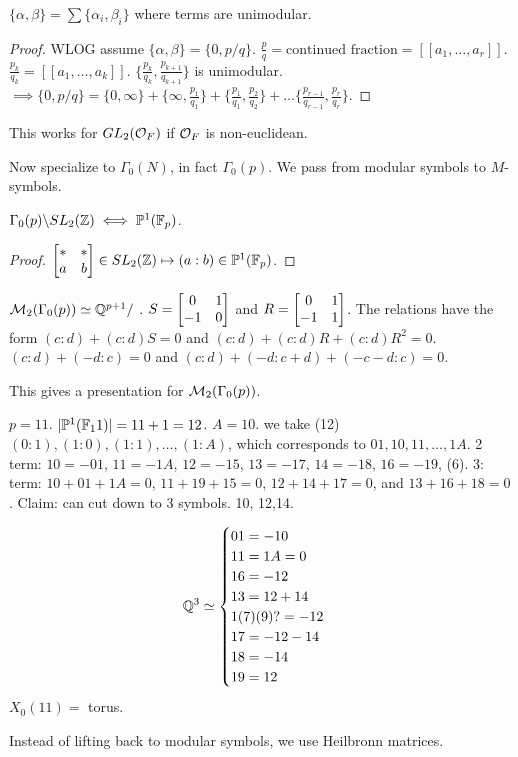 \documentclass[]{article}
\begin{document}
\begin{theorem}
	$\{\alpha,\beta\} = \sum\{\alpha_i,\beta_i\}$ where terms are unimodular.
\end{theorem}
\begin{proof}
	WLOG assume $\{\alpha,\beta\} = \{0,p/q\}$. $\frac{p}{q} = \text{continued fraction} = [[a_1,\dots,a_r]]$. $\frac{p_k}{q_k} = [[a_1,\dots,a_k]]$. $\{\frac{p_k}{q_k},\frac{p_{k+1}}{q_{k+1}}\}$ is unimodular. $\implies \{0,p/q\} = \{0,\infty\} + \{\infty,\frac{p_1}{q_1}\} + \{\frac{p_1}{q_1},\frac{p_2}{q_2}\} + \dots \{\frac{p_{r-1}}{q_{r-1}},\frac{p_r}{q_r}\}$.
\end{proof}
\begin{remark}
	This works for $GL_2(\mathcal{O}_F)$ if $\mathcal{O}_F$ is non-euclidean.
\end{remark}
Now specialize to $\Gamma_0(N)$, in fact $\Gamma_0(p)$. We pass from modular symbols to $M$-symbols.
\begin{proposition}
	$\Gamma_0(p)\backslash SL_2(\mathbb{Z}) \overset{~}{\iff} \mathbb{P}^1(\mathbb{F}_p)$.
\end{proposition}
\begin{proof}
	$\begin{bmatrix}*&*\\a&b\end{bmatrix}\in SL_2(\mathbb{Z}) \mapsto (a:b) \in \mathbb{P}^1(\mathbb{F}_p)$.
\end{proof}

$\mathcal{M}_2(\Gamma_0(p)) \simeq \mathbb{Q}^{p+1}/~$. $S = \begin{bmatrix}0&1\\-1&0\end{bmatrix}$ and $R = \begin{bmatrix}0&1\\-1&1\end{bmatrix}$. The relations have the form $(c:d)+(c:d)S = 0$ and $(c:d) + (c:d)R+(c:d)R^2 = 0$.
$(c:d) + (-d:c) = 0$ and $(c:d) + (-d:c+d)+(-c-d:c) = 0$.

\begin{theorem}
	This gives a presentation for $\mathcal{M}_2(\Gamma_0(p))$.
\end{theorem}
\begin{example}
	$p=11$. $|\mathbb{P}^1(\mathbb{F}_11)| = 11+1 = 12$. $A = 10$. we take (12) $(0:1),(1:0),(1:1),\dots,(1:A)$, which corresponds to $01,10,11,\dots,1A$. 2 term: $10=-01$, $11=-1A$, $12=-15$, $13=-17$, $14 = -18$, $16=-19$, (6). 3: term: $10+01+1A=0$, $11+19+15 = 0$, $12+14+17=0$, and $13+16+18 = 0$.
	Claim: can cut down to 3 symbols. 10, 12,14. 
	
	$$\mathbb{Q}^3 \simeq \begin{cases}01=-10 \\ 11 = 1A = 0 \\ 16 = -12 \\ 13 = 12+14 \\ 1(7)(9)? = -12\\ 17 = -12-14 \\ 18 = -14 \\ 19 = 12 \end{cases}$$
	$X_0(11) = $ torus.
\end{example}
Instead of lifting back to modular symbols, we use Heilbronn matrices.
\end{document}
